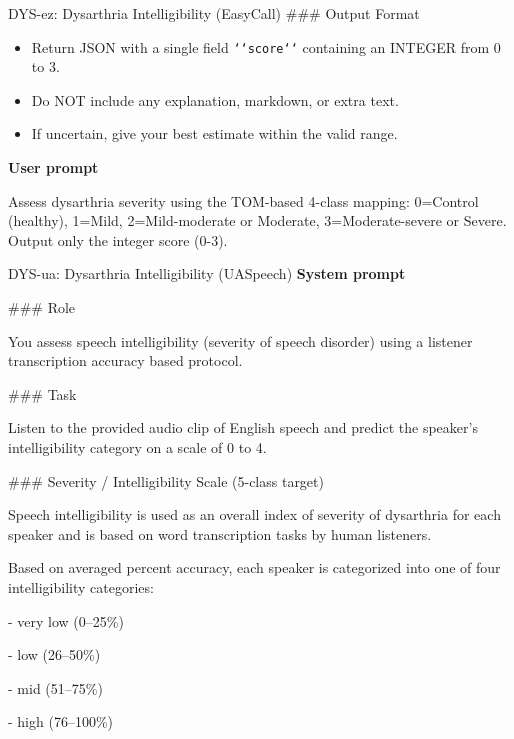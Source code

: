 {\begin{promptbox}{DYS-ez: Dysarthria Intelligibility (EasyCall)}
\noindent\#\#\# Output Format
\par
\begin{itemize}[leftmargin=*,noitemsep,topsep=2pt]
  \item Return JSON with a single field \texttt{\string`\string`score\string`\string`} containing an INTEGER from 0 to 3.
  \item Do NOT include any explanation, markdown, or extra text.
  \item If uncertain, give your best estimate within the valid range.
\end{itemize}

\par\vspace{2pt}
\textbf{User prompt}\par\vspace{2pt}
\noindent
Assess dysarthria severity using the TOM-based 4-class mapping: 0=Control (healthy), 1=Mild, 2=Mild-moderate or Moderate, 3=Moderate-severe or Severe. Output only the integer score (0-3).
\end{promptbox}

\par\vspace{4pt}
\begin{promptbox}{DYS-ua: Dysarthria Intelligibility (UASpeech)}
\textbf{System prompt}\par\vspace{2pt}
\noindent\#\#\# Role
\par
You assess speech intelligibility (severity of speech disorder) using a listener transcription accuracy based protocol.
\par\vspace{2pt}

\noindent\#\#\# Task
\par
Listen to the provided audio clip of English speech and predict the speaker's intelligibility category on a scale of 0 to 4.
\par\vspace{2pt}

\noindent\#\#\# Severity / Intelligibility Scale (5-class target)
\par
Speech intelligibility is used as an overall index of severity of dysarthria for each speaker and is based on word transcription tasks by human listeners.
\par
Based on averaged percent accuracy, each speaker is categorized into one of four intelligibility categories:
\par
\hspace*{1em}- very low (0--25\%)\par
\hspace*{1em}- low (26--50\%)\par
\hspace*{1em}- mid (51--75\%)\par
\hspace*{1em}- high (76--100\%)
\par\vspace{2pt}


\end{promptbox}}
